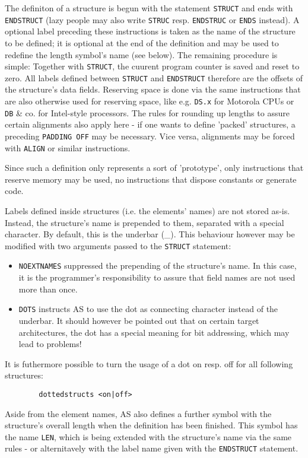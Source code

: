 \documentclass[12pt,twoside]{report}
\newcommand{\tty}[1]{{\tt #1}}
\begin{document}
The definiton of a structure is begun with the statement
\tty{STRUCT} and ends with \tty{ENDSTRUCT} (lazy people may also
write {\tt STRUC} resp.  {\tt ENDSTRUC} or {\tt ENDS} instead).
A optional label preceding these instructions is taken as the
name of the structure to be defined; it is optional at the end of
the definition and may be used to redefine the length symbol's
name (see below).  The remaining procedure is simple: Together
with \tty{STRUCT}, the cuurent program counter is saved and reset
to zero.  All labels defined between \tty{STRUCT} and
\tty{ENDSTRUCT} therefore are the offsets of the structure's data
fields.  Reserving space is done via the same instructions that
are also otherwise used for reserving space, like e.g.
\tty{DS.x} for Motorola CPUs or \tty{DB} \& co.  for Intel-style
processors.  The rules for rounding up lengths to assure certain
alignments also apply here - if one wants to define 'packed'
structures, a preceding {\tt PADDING OFF} may be necessary.  Vice
versa, alignments may be forced with {\tt ALIGN} or similar
instructions.

Since such a definition only represents a sort of 'prototype', only
instructions that reserve memory may be used, no instructions that dispose
constants or generate code.

Labels defined inside structures (i.e. the elements' names) are not
stored as-is.  Instead, the structure's name is prepended to them,
separated with a special character.  By default, this is the underbar
(\_).  This behaviour however may be modified with two arguments passed
to the
\tty{STRUCT} statement:
\begin{itemize}
\item{\tty{NOEXTNAMES} suppressed the prepending of the structure's name.
      In this case, it is the programmer's responsibility to assure that
      field names are not used more than once.}
\item{\tty{DOTS} instructs AS to use the dot as connecting character
      instead of the underbar.  It should however be pointed out that
      on certain target architectures, the dot has a special meaning
      for bit addressing, which may lead to problems!}
\end{itemize}
It is futhermore possible to turn the usage of a dot on resp. off for all
following structures:
\begin{verbatim}
        dottedstructs <on|off>
\end{verbatim}

Aside from the element names, AS also defines a further symbol with the
structure's overall length when the definition has been finished.  This
symbol has the name {\tt LEN}, which is being extended with the
structure's name via the same rules - or alternitavely with the label name
given with the \tty{ENDSTRUCT} statement.
\end{document}
